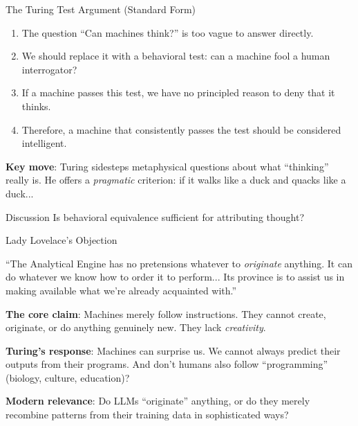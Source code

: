 \documentclass[aspectratio=169,11pt]{beamer}
\begin{document}
\begin{frame}{The Turing Test Argument (Standard Form)}
\begin{probox}
\small
\begin{enumerate}
    \item The question ``Can machines think?'' is too vague to answer directly.
    \item We should replace it with a behavioral test: can a machine fool a human interrogator?
    \item If a machine passes this test, we have no principled reason to deny that it thinks.
    \item Therefore, a machine that consistently passes the test should be considered intelligent.
\end{enumerate}
\end{probox}

\vspace{0.1em}
\textbf{Key move}: Turing sidesteps metaphysical questions about what ``thinking'' really is. He offers a \emph{pragmatic} criterion: if it walks like a duck and quacks like a duck...

\vspace{0.1em}
\begin{alertblock}{Discussion}
Is behavioral equivalence sufficient for attributing thought?
\end{alertblock}
\end{frame}

\begin{frame}{Lady Lovelace's Objection}
\begin{casestudybox}
\small
``The Analytical Engine has no pretensions whatever to \emph{originate} anything. It can do whatever we know how to order it to perform... Its province is to assist us in making available what we're already acquainted with.''
\end{casestudybox}

\vspace{0.3em}
\textbf{The core claim}: Machines merely follow instructions. They cannot create, originate, or do anything genuinely new. They lack \emph{creativity}.

\vspace{0.3em}
\textbf{Turing's response}: Machines can surprise us. We cannot always predict their outputs from their programs. And don't humans also follow ``programming'' (biology, culture, education)?

\vspace{0.3em}
\textbf{Modern relevance}: Do LLMs ``originate'' anything, or do they merely recombine patterns from their training data in sophisticated ways?
\end{frame}
\end{document}
